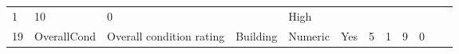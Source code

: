\documentclass[11pt]{article}
\begin{document}
\begin{longtable}[]{@{}llllllllllll@{}}
\begin{minipage}[t]{0.04\columnwidth}
1\strut
\end{minipage} & \begin{minipage}[t]{0.04\columnwidth}\raggedright\strut
10\strut
\end{minipage} & \begin{minipage}[t]{0.04\columnwidth}\raggedright\strut
0\strut
\end{minipage} & \begin{minipage}[t]{0.04\columnwidth}\raggedright\strut
\strut
\end{minipage} & \begin{minipage}[t]{0.04\columnwidth}\raggedright\strut
High\strut
\end{minipage}\tabularnewline
\begin{minipage}[t]{0.04\columnwidth}\raggedright\strut
19\strut
\end{minipage} & \begin{minipage}[t]{0.04\columnwidth}\raggedright\strut
OverallCond\strut
\end{minipage} & \begin{minipage}[t]{0.04\columnwidth}\raggedright\strut
Overall condition rating\strut
\end{minipage} & \begin{minipage}[t]{0.04\columnwidth}\raggedright\strut
Building\strut
\end{minipage} & \begin{minipage}[t]{0.04\columnwidth}\raggedright\strut
Numeric\strut
\end{minipage} & \begin{minipage}[t]{0.04\columnwidth}\raggedright\strut
Yes\strut
\end{minipage} & \begin{minipage}[t]{0.04\columnwidth}\raggedright\strut
5\strut
\end{minipage} & \begin{minipage}[t]{0.04\columnwidth}\raggedright\strut
1\strut
\end{minipage} & \begin{minipage}[t]{0.04\columnwidth}\raggedright\strut
9\strut
\end{minipage} & \begin{minipage}[t]{0.04\columnwidth}\raggedright\strut
0\strut
\end{minipage} & \begin{minipage}[t]{0.04\columnwidth}\raggedright\strut
\strut
\end{minipage} & \begin{minipage}[t]{0.04\columnwidth}\raggedright\strut

\end{minipage}
\end{longtable}
\end{document}
